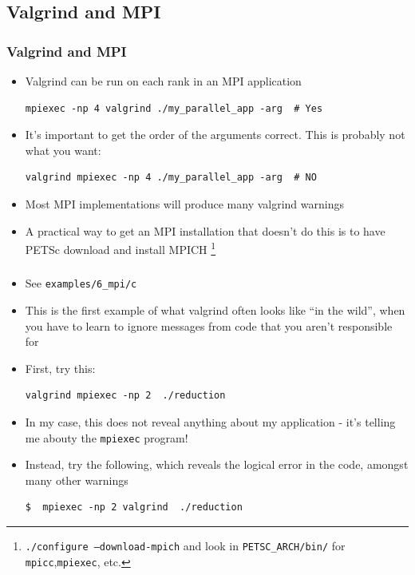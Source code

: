 \documentclass{beamer}
\begin{document}
\subsection{Valgrind and MPI}

\begin{frame}[fragile]
\frametitle{Valgrind and MPI}
\begin{itemize}
\item Valgrind can be run on each rank in an MPI application
\begin{lstlisting}
mpiexec -np 4 valgrind ./my_parallel_app -arg  # Yes
\end{lstlisting}
\item It's important  to get the order of the arguments correct. This is probably not what you want:
\begin{lstlisting}
valgrind mpiexec -np 4 ./my_parallel_app -arg  # NO
\end{lstlisting}
\item Most MPI implementations will produce many valgrind warnings
\item A practical way to get an MPI installation that doesn't do this is to have PETSc download and install MPICH \footnote{\texttt{./configure --download-mpich} and look in \texttt{PETSC\_ARCH/bin/} for \texttt{mpicc},\texttt{mpiexec}, etc.}
\end{itemize}
\end{frame}

\begin{frame}[fragile]
\frametitle{}
\begin{itemize}
\item See \texttt{examples/6\_mpi/c}
\item This is the first example of what valgrind often looks like ``in the wild'', when you have to learn to ignore messages from code that you aren't responsible for
\item First, try this:
\begin{lstlisting}
valgrind mpiexec -np 2  ./reduction
\end{lstlisting}
\item In my case, this does not reveal anything about my application - it's telling me abouty the \texttt{mpiexec} program!
\item Instead, try the following, which reveals the logical error in the code, amongst many other warnings
\begin{lstlisting}
$  mpiexec -np 2 valgrind  ./reduction
\end{lstlisting}
\end{itemize}
\end{frame}
\end{document}

